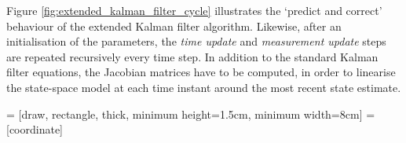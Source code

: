 Figure \ref{fig:extended_kalman_filter_cycle} illustrates the `predict and correct' behaviour of the extended Kalman filter algorithm. Likewise, after an initialisation of the parameters, the \emph{time update} and \emph{measurement update} steps are repeated recursively every time step. In addition to the standard Kalman filter equations, the Jacobian matrices have to be computed, in order to linearise the state-space model at each time instant around the most recent state estimate.

 = [draw, rectangle, thick, 
    minimum height=1.5cm, minimum width=8cm]
 = [coordinate]

\begin{figure}[t]
\centering
\begin{tikzpicture}[auto, rounded corners=1pt, node distance=5cm,>=latex']
    

\end{tikzpicture}
\end{figure}
